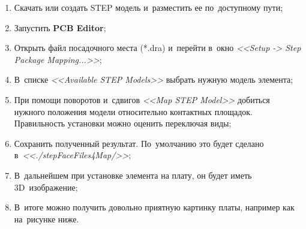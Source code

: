 \begin{enumerate}
	\item Скачать или создать STEP модель и~разместить ее по~доступному пути;
	
	\item Запустить \textbf{PCB Editor};
	
	\item Открыть файл посадочного места (*.dra) и~перейти в~окно \textit{<<Setup -> Step Package Mapping...>>};
	
	\item В~списке \textit{<<Available STEP Models>>} выбрать нужную модель элемента;
	
	\begin{figure}[H]
	\end{figure}
	
	\item При помощи поворотов и~сдвигов \textit{<<Map STEP Model>>} добиться нужного положения модели относительно контактных площадок. Правильность установки можно оценить переключая виды;
	\item Сохранить полученный результат. По~умолчанию это будет сделано в~\textit{<<./stepFaceFiles4Map/>>};
	
	\item В~дальнейшем при установке элемента на плату, он будет иметь 3D~изображение;
	
	\item В~итоге можно получить довольно приятную картинку платы, например как на~рисунке ниже.
	
	\begin{figure}[H]
	\end{figure}
\end{enumerate}



